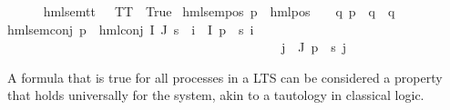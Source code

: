 \begin{isabellebody}
{\isacharparenleft}{\kern0pt}{\isacartoucheopen}{\isacharunderscore}{\kern0pt}\ {\isasymTurnstile}\ {\isacharunderscore}{\kern0pt}{\isacartoucheclose}\ {\isacharbrackleft}{\kern0pt}{}{}{\isacharcomma}{\kern0pt}\ {}{}{\isacharbrackright}{\kern0pt}\ {}{}{\isacharparenright}{\kern0pt}\isanewline
{}\isanewline
hml{\isacharunderscore}{\kern0pt}sem{\isacharunderscore}{\kern0pt}tt{\isacharcolon}{\kern0pt}\ {\isacartoucheopen}{\isacharparenleft}{\kern0pt}{\isacharunderscore}{\kern0pt}\ {\isasymTurnstile}\ TT{\isacharparenright}{\kern0pt}\ {\isacharequal}{\kern0pt}\ True{\isacartoucheclose}\ {\isacharbar}{\kern0pt}\isanewline
hml{\isacharunderscore}{\kern0pt}sem{\isacharunderscore}{\kern0pt}pos{\isacharcolon}{\kern0pt}\ {\isacartoucheopen}{\isacharparenleft}{\kern0pt}p\ {\isasymTurnstile}\ {\isacharparenleft}{\kern0pt}hml{\isacharunderscore}{\kern0pt}pos\ {\isasymalpha}\ {\isasymphi}{\isacharparenright}{\kern0pt}{\isacharparenright}{\kern0pt}\ {\isacharequal}{\kern0pt}\ {\isacharparenleft}{\kern0pt}{\isasymexists}q{\isachardot}{\kern0pt}\ {\isacharparenleft}{\kern0pt}p\ {\isasymmapsto}{\isasymalpha}\ q{\isacharparenright}{\kern0pt}\ {\isasymand}\ q\ {\isasymTurnstile}\ {\isasymphi}{\isacharparenright}{\kern0pt}{\isacartoucheclose}\ {\isacharbar}{\kern0pt}\isanewline
hml{\isacharunderscore}{\kern0pt}sem{\isacharunderscore}{\kern0pt}conj{\isacharcolon}{\kern0pt}\ {\isacartoucheopen}{\isacharparenleft}{\kern0pt}p\ {\isasymTurnstile}\ {\isacharparenleft}{\kern0pt}hml{\isacharunderscore}{\kern0pt}conj\ I\ J\ {\isasympsi}s{\isacharparenright}{\kern0pt}{\isacharparenright}{\kern0pt}\ {\isacharequal}{\kern0pt}\ {\isacharparenleft}{\kern0pt}{\isacharparenleft}{\kern0pt}{\isasymforall}i\ {\isasymin}\ I{\isachardot}{\kern0pt}\ p\ {\isasymTurnstile}\ {\isacharparenleft}{\kern0pt}{\isasympsi}s\ i{\isacharparenright}{\kern0pt}{\isacharparenright}{\kern0pt}\isanewline
\ \ \ \ \ \ \ \ \ \ \ \ \ \ \ \ \ \ \ \ \ \ \ \ \ \ \ \ \ \ \ \ \ \ \ \ \ \ \ \ \ \ {\isasymand}\ {\isacharparenleft}{\kern0pt}{\isasymforall}j\ {\isasymin}\ J{\isachardot}{\kern0pt}\ {\isasymnot}{\isacharparenleft}{\kern0pt}p\ {\isasymTurnstile}\ {\isacharparenleft}{\kern0pt}{\isasympsi}s\ j{\isacharparenright}{\kern0pt}{\isacharparenright}{\kern0pt}{\isacharparenright}{\kern0pt}{\isacharparenright}{\kern0pt}{\isacartoucheclose}%
\begin{isamarkuptext}%
A formula that is true for all processes in a LTS can be considered a property that holds universally for the system, akin to a tautology in classical logic.%

\end{isamarkuptext}
\end{isabellebody}
